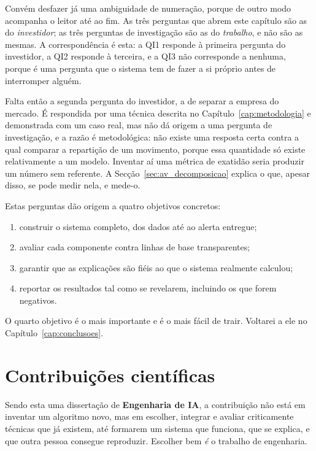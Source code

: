 Convém desfazer já uma ambiguidade de numeração, porque de outro modo acompanha o leitor até ao
fim. As três perguntas que abrem este capítulo são as do \emph{investidor}; as três perguntas de
investigação são as do \emph{trabalho}, e não são as mesmas. A correspondência é esta: a \gls{QI}1
responde à primeira pergunta do investidor, a \gls{QI}2 responde à terceira, e a \gls{QI}3 não
corresponde a nenhuma, porque é uma pergunta que o sistema tem de fazer a si próprio antes de
interromper alguém.

Falta então a segunda pergunta do investidor, a de separar a empresa do mercado. É respondida por
uma técnica descrita no Capítulo~\ref{cap:metodologia} e demonstrada com um caso real, mas não dá
origem a uma pergunta de investigação, e a razão é metodológica: não existe uma resposta certa contra
a qual comparar a repartição de um movimento, porque essa quantidade só existe relativamente a um
modelo. Inventar aí uma métrica de exatidão seria produzir um número sem referente. A
Secção~\ref{sec:av_decomposicao} explica o que, apesar disso, se pode medir nela, e mede-o.

Estas perguntas dão origem a quatro objetivos concretos:

\begin{enumerate}
  \item construir o sistema completo, dos dados até ao alerta entregue;
  \item avaliar cada componente contra linhas de base transparentes;
  \item garantir que as explicações são fiéis ao que o sistema realmente calculou;
  \item reportar os resultados tal como se revelarem, incluindo os que forem negativos.
\end{enumerate}

O quarto objetivo é o mais importante e é o mais fácil de trair. Voltarei a ele no
Capítulo~\ref{cap:conclusoes}.

\section{Contribuições científicas}
\label{sec:intro_contribuicoes}

Sendo esta uma dissertação de \textbf{Engenharia de \gls{IA}}, a contribuição não está
em inventar um algoritmo novo, mas em escolher, integrar e avaliar criticamente técnicas que já
existem, até formarem um sistema que funciona, que se explica, e que outra pessoa consegue
reproduzir. Escolher bem \emph{é} o trabalho de engenharia.

